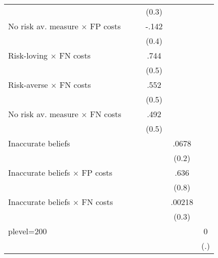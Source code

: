 \begin{table}[htbp]
\begin{tabular}{l*{5}{c}}
                &                  &                  &    (0.3)         &                  &                  \\
No risk av. measure $\times$ FP costs&                  &                  &    -.142         &                  &                  \\
                &                  &                  &    (0.4)         &                  &                  \\
Risk-loving $\times$ FN costs&                  &                  &     .744         &                  &                  \\
                &                  &                  &    (0.5)         &                  &                  \\
Risk-averse $\times$ FN costs&                  &                  &     .552         &                  &                  \\
                &                  &                  &    (0.5)         &                  &                  \\
No risk av. measure $\times$ FN costs&                  &                  &     .492         &                  &                  \\
                &                  &                  &    (0.5)         &                  &                  \\
Inaccurate beliefs&                  &                  &                  &    .0678         &                  \\
                &                  &                  &                  &    (0.2)         &                  \\
Inaccurate beliefs $\times$ FP costs&                  &                  &                  &     .636         &                  \\
                &                  &                  &                  &    (0.8)         &                  \\
Inaccurate beliefs $\times$ FN costs&                  &                  &                  &   .00218         &                  \\
                &                  &                  &                  &    (0.3)         &                  \\
plevel=200      &                  &                  &                  &                  &        0         \\
                &                  &                  &                  &                  &      (.)         \\

\end{tabular}
\end{table}
